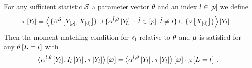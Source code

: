 \begin{lemma}
    \label{lem:mmContractionEquation}
    For any sufficient statistic $\mathcal{S}$ a parameter vector $\theta$ and an index $l\in[p]$ we define
    \begin{align*}
        \tau\left[Y_{l}\right]
        = \left\langle \{\beta^{\mathcal{S}}\left[Y_{[p]},X_{[d]}\right]\}\cup\{\alpha^{\tilde{l},\theta}\left[Y_{\tilde{l}}\right] \,:\, \tilde{l} \in [p] ,\, \tilde{l}\neq l\} \cup \{\nu\left[X_{[d]}\right]\}\right\rangle \left[ Y_{l} \right] \, .
    \end{align*}
    Then the moment matching condition for $s_{l}$ relative to $\theta$ and $\mu$ is satisfied for any $\theta\left[L_{}=l_{}\right]$ with
    \begin{align*}
        \left\langle \alpha^{l,\theta}\left[Y_{l}\right], I_{l}\left[Y_{l}\right], \tau\left[Y_{l}\right]\right\rangle \left[ \varnothing \right]
        = \left\langle \alpha^{l,\theta}\left[Y_{l}\right], \tau\left[Y_{l}\right]\right\rangle \left[ \varnothing \right] \cdot \mu\left[L_{}=l_{}\right] \, .
    \end{align*}
\end{lemma}
